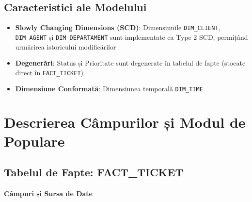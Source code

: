 \section{Caracteristici ale Modelului}

\begin{itemize}
    \item \textbf{Slowly Changing Dimensions (SCD)}: Dimensiunile \texttt{DIM\_CLIENT}, \texttt{DIM\_AGENT} și \texttt{DIM\_DEPARTAMENT} sunt implementate ca Type 2 SCD, permițând urmărirea istoricului modificărilor
    \item \textbf{Degenerări}: Status și Prioritate sunt degenerate în tabelul de fapte (stocate direct în \texttt{FACT\_TICKET})
    \item \textbf{Dimensiune Conformată}: Dimensiunea temporală \texttt{DIM\_TIME}
\end{itemize}

\chapter{Descrierea Câmpurilor și Modul de Populare}
\label{sec:campuri_populare}

\section{Tabelul de Fapte: FACT\_TICKET}

\subsubsection{Câmpuri și Sursa de Date}

